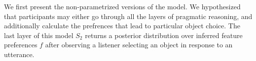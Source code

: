 \documentclass[10pt,a4paper]{article}
\begin{document}


We first present the non-parametrized versions of the model. We hypothesized that participants may either go through all the layers of pragmatic reasoning, and additionally calculate the prefrences that lead to particular object choice. The last layer of this model $S_2$  returns a posterior distribution over inferred feature preferences $f$ after observing a listener selecting an object in response to an utterance. 
\end{document}
